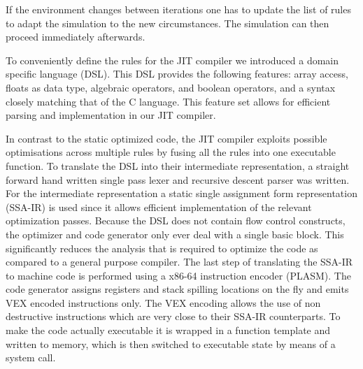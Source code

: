 If the environment changes between iterations one has to update the list of rules to adapt the simulation to the new circumstances.
The simulation can then proceed immediately afterwards.

To conveniently define the rules for the JIT compiler we introduced a domain specific language (DSL). This DSL provides the following features: array access, floats as data type, algebraic operators, and boolean operators, and a syntax closely matching that of the C language. This feature set allows for efficient parsing and implementation in our JIT compiler.

In contrast to the static optimized code, the JIT compiler exploits possible optimisations across multiple rules by fusing all the rules into one executable function. %
To translate the DSL into their intermediate representation, a straight forward hand written single pass lexer and recursive descent parser was written. %
For the intermediate representation a static single assignment form representation (SSA-IR)\cite[Chapter~6.2.4]{dragon}\cite{LuaJITir} is used since it allows efficient implementation of the relevant optimization passes. Because the DSL does not contain flow control constructs, the optimizer and code generator only ever deal with a single basic block. This significantly reduces the analysis that is required to optimize the code as compared to a general purpose compiler. The last step of translating the SSA-IR to machine code is performed using a x86-64 instruction encoder (PLASM). The code generator assigns registers and stack spilling locations on the fly and emits VEX encoded instructions only. The VEX encoding allows the use of non destructive instructions which are very close to their SSA-IR counterparts. To make the code actually executable it is wrapped in a function template and written to memory, which is then switched to executable state by means of a system call.


